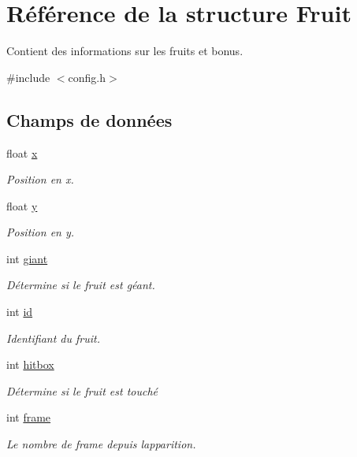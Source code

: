 \hypertarget{struct_fruit}{}\section{Référence de la structure Fruit}
\label{struct_fruit}


Contient des informations sur les fruits et bonus.  




{\ttfamily \#include $<$config.\+h$>$}

\subsection*{Champs de données}
\begin{DoxyCompactItemize}
\item 
float \hyperlink{struct_fruit_a3d27e03eee7dbd48ee8913bf3926723b}{x}
\begin{DoxyCompactList}\small\item\em Position en x. \end{DoxyCompactList}\item 
float \hyperlink{struct_fruit_a3a451bf39acece88739440190b1ccd98}{y}
\begin{DoxyCompactList}\small\item\em Position en y. \end{DoxyCompactList}\item 
int \hyperlink{struct_fruit_acc2ff34be47aa68ba9cec0f497b3eef1}{giant}
\begin{DoxyCompactList}\small\item\em Détermine si le fruit est géant. \end{DoxyCompactList}\item 
int \hyperlink{struct_fruit_af1da6ce5a7b5410ff657800b2fa25d55}{id}
\begin{DoxyCompactList}\small\item\em Identifiant du fruit. \end{DoxyCompactList}\item 
int \hyperlink{struct_fruit_ad5ce4a532379874dc475ec24b07af673}{hitbox}
\begin{DoxyCompactList}\small\item\em Détermine si le fruit est touché \end{DoxyCompactList}\item 
int \hyperlink{struct_fruit_a7899212f1f18f4ec648272999084a98b}{frame}
\begin{DoxyCompactList}\small\item\em Le nombre de frame depuis l\textquotesingle{}apparition. \end{DoxyCompactList}\item 

\end{DoxyCompactItemize}
